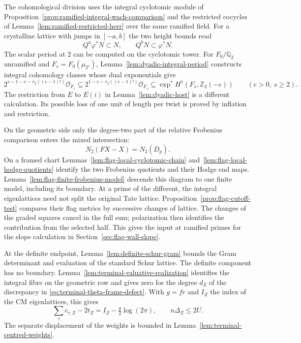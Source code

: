 The cohomological division uses the integral cyclotomic module
of Proposition~\ref{prop:ramified-integral-wach-comparison} and the
restricted cocycles of Lemma~\ref{lem:ramified-restricted-herr} over the
same ramified field. For a crystalline lattice with jumps in \([-a,b]\)
the two height bounds read
\[
             Q^a\varphi^*N\subset N,\qquad Q^b N\subset\varphi^*N .
\]
The scalar period at \(2\) can be computed on the cyclotomic tower. For
\(F_0/\mathbb Q_2\) unramified and \(F_s=F_0(\mu_{2^s})\),
Lemma~\ref{lem:dyadic-integral-period} constructs integral cohomology
classes whose dual exponentials give
\[
 2^{s-1-e-v_2((e-1)!)}\mathcal O_{F_s}
     \subseteq 2^{1-e-v_2((e-1)!)}\mathcal O_{F_s}
     \subseteq\exp^* H^1(F_s,\mathbb Z_2(-e))
          \qquad(e>0,\ s\ge2).
\]
The restriction from \(E\) to \(E(i)\) in Lemma~\ref{lem:dyadic-host}
is a different calculation. Its possible loss of one unit of length per twist
is proved by inflation and restriction.

On the geometric side only the degree-two part of the relative
Frobenius comparison enters the mixed intersection:
\[
             N_2(FX-X)=N_2(D_p).
\]
On a framed chart Lemmas~\ref{lem:flag-local-cyclotomic-chain} and~\ref{lem:flag-local-hodge-quotients} identify the two Frobenius quotients and their Hodge end maps. Lemma~\ref{lem:flag-finite-frobenius-model} descends this diagram to one finite model, including its boundary. At a prime of the different, the integral eigenlattices need not split the original Tate lattice. Proposition~\ref{prop:flag-cutoff-test} compares their flag metrics by successive changes of lattice. The changes of the graded squares cancel in the full sum; polarization then identifies the contribution from the selected half. This gives the input at ramified primes for the slope calculation in Section~\ref{sec:flag-wall-slope}.

At the definite endpoint,
Lemma~\ref{lem:definite-schur-gram} bounds the Gram determinant and
evaluation of the standard Schur lattice. The definite component has no boundary. Lemma~\ref{lem:terminal-valuative-realization} identifies the integral fibre on the geometric row and gives zero for the degree \(d_Z\) of the discrepancy in \eqref{eq:terminal-theta-frame-defect}. With \(g=fr\) and \(I_Z\) the index of the CM eigenlattices, this gives
\[
 \sum_\tau c_{\tau,Z}-2t_Z= I_Z-\tfrac g2\log(2\pi),\qquad
                   n\Delta_Z\le2U .
\]
The separate displacement of the weights is bounded in Lemma~\ref{lem:terminal-centred-weights}.

